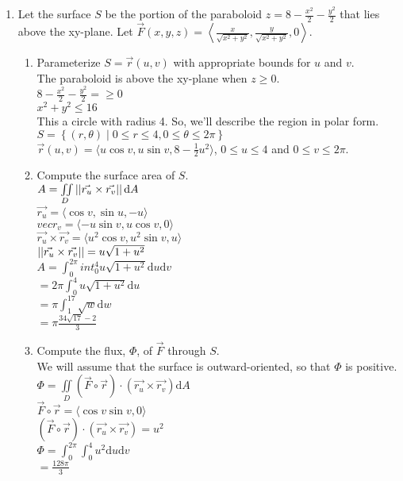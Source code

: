 \begin{enumerate}
	\item Let the surface $S$ be the portion of the paraboloid $z = 8 - \frac{x^2}{2} - \frac{y^2}{2}$ that lies above the xy-plane. Let $\vec{F}(x,y,z) = \left< \frac{x}{\sqrt{x^2 + y^2}}, \frac{y}{\sqrt{x^2 + y^2}}, 0 \right>$.
	\begin{enumerate}[label=\alph*.]
		\item Parameterize $S = \vec{r}(u,v)$ with appropriate bounds for $u$ and $v$.\\
		\indent
		The paraboloid is above the xy-plane when $z \geq 0$.\\
		$8 - \frac{x^2}{2} - \frac{y^2}{2} = \geq 0$\\
		$x^2 + y^2 \leq 16$\\
		This a circle with radius 4. So, we'll describe the region in polar form.\\
		$S = \left\{ (r,\theta) \mid 0 \leq r \leq 4, 0 \leq \theta \leq 2\pi \right\}$\\
		$\vec{r}(u,v) = \langle u\cos{v}, u\sin{v}, 8 - \frac{1}{2}u^2 \rangle$, $0 \leq u \leq 4$ and $0 \leq v \leq 2\pi$.\\
		
		\item Compute the surface area of $S$.\\
		\indent
		$A = \iint\limits_{D}{\left|\left|\vec{r_u} \times \vec{r_v}\right|\right|\mathrm{d}A}$\\
		$\vec{r_u} = \langle \cos{v}, \sin{u}, -u \rangle$\\
		$vec{r_v} = \langle -u\sin{v}, u\cos{v}, 0 \rangle$\\
		$\vec{r_u} \times \vec{r_v} = \langle u^2\cos{v}, u^2\sin{v}, u\rangle$\\
		$\left|\left|\vec{r_u} \times \vec{r_v}\right|\right| = u\sqrt{1 + u^2}$\\
		$A = \int_{0}^{2\pi}{int_{0}^{4}{u\sqrt{1 + u^2}\mathrm{d}u}\mathrm{d}v}$\\
		$= 2\pi\int_{0}^{4}{u\sqrt{1 + u^2}\mathrm{d}u}$\\
		$= \pi\int_{1}^{17}{\sqrt{w}\mathrm{d}w}$\\
		$= \pi\frac{34\sqrt{17} - 2}{3}$\\
		
		\item Compute the flux, $\Phi$, of $\vec{F}$ through $S$.\\
		\indent
		We will assume that the surface is outward-oriented, so that $\Phi$ is positive.\\
		$\Phi = \iint\limits_{D}{\left(\vec{F}\circ\vec{r}\right) \cdot \left(\vec{r_u} \times \vec{r_v}\right)\mathrm{d}A}$\\
		$\vec{F}\circ\vec{r} = \langle \cos{v}\sin{v}, 0 \rangle$\\
		$\left(\vec{F}\circ\vec{r}\right) \cdot \left(\vec{r_u} \times \vec{r_v}\right) = u^2$\\
		$\Phi = \int_{0}^{2\pi}{\int_{0}^{4}{u^2\mathrm{d}u}\mathrm{d}v}$\\
		$= \frac{128\pi}{3}$\\
	\end{enumerate}
	

\end{enumerate}
